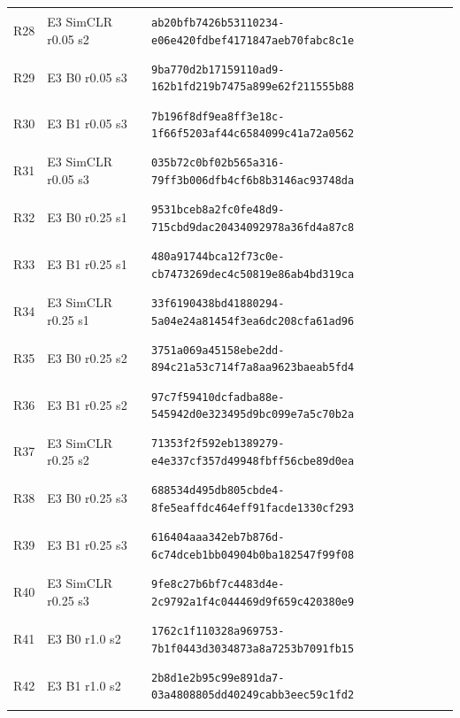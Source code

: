 \begin{longtable}{@{}l>{\raggedright\arraybackslash}p{3.5cm}p{10.8cm}@{}}
\hypertarget{R28}{R28} & E3 SimCLR r0.05 s2 & {\fontsize{8.8}{11}\selectfont\texttt{ab20bfb7426b53110234-e06e420fdbef4171847aeb70fabc8c1e}} \\
\hypertarget{R29}{R29} & E3 B0 r0.05 s3 & {\fontsize{8.8}{11}\selectfont\texttt{9ba770d2b17159110ad9-162b1fd219b7475a899e62f211555b88}} \\
\hypertarget{R30}{R30} & E3 B1 r0.05 s3 & {\fontsize{8.8}{11}\selectfont\texttt{7b196f8df9ea8ff3e18c-1f66f5203af44c6584099c41a72a0562}} \\
\hypertarget{R31}{R31} & E3 SimCLR r0.05 s3 & {\fontsize{8.8}{11}\selectfont\texttt{035b72c0bf02b565a316-79ff3b006dfb4cf6b8b3146ac93748da}} \\
\hypertarget{R32}{R32} & E3 B0 r0.25 s1 & {\fontsize{8.8}{11}\selectfont\texttt{9531bceb8a2fc0fe48d9-715cbd9dac20434092978a36fd4a87c8}} \\
\hypertarget{R33}{R33} & E3 B1 r0.25 s1 & {\fontsize{8.8}{11}\selectfont\texttt{480a91744bca12f73c0e-cb7473269dec4c50819e86ab4bd319ca}} \\
\hypertarget{R34}{R34} & E3 SimCLR r0.25 s1 & {\fontsize{8.8}{11}\selectfont\texttt{33f6190438bd41880294-5a04e24a81454f3ea6dc208cfa61ad96}} \\
\hypertarget{R35}{R35} & E3 B0 r0.25 s2 & {\fontsize{8.8}{11}\selectfont\texttt{3751a069a45158ebe2dd-894c21a53c714f7a8aa9623baeab5fd4}} \\
\hypertarget{R36}{R36} & E3 B1 r0.25 s2 & {\fontsize{8.8}{11}\selectfont\texttt{97c7f59410dcfadba88e-545942d0e323495d9bc099e7a5c70b2a}} \\
\hypertarget{R37}{R37} & E3 SimCLR r0.25 s2 & {\fontsize{8.8}{11}\selectfont\texttt{71353f2f592eb1389279-e4e337cf357d49948fbff56cbe89d0ea}} \\
\hypertarget{R38}{R38} & E3 B0 r0.25 s3 & {\fontsize{8.8}{11}\selectfont\texttt{688534d495db805cbde4-8fe5eaffdc464eff91facde1330cf293}} \\
\hypertarget{R39}{R39} & E3 B1 r0.25 s3 & {\fontsize{8.8}{11}\selectfont\texttt{616404aaa342eb7b876d-6c74dceb1bb04904b0ba182547f99f08}} \\
\hypertarget{R40}{R40} & E3 SimCLR r0.25 s3 & {\fontsize{8.8}{11}\selectfont\texttt{9fe8c27b6bf7c4483d4e-2c9792a1f4c044469d9f659c420380e9}} \\
\hypertarget{R41}{R41} & E3 B0 r1.0 s2 & {\fontsize{8.8}{11}\selectfont\texttt{1762c1f110328a969753-7b1f0443d3034873a8a7253b7091fb15}} \\
\hypertarget{R42}{R42} & E3 B1 r1.0 s2 & {\fontsize{8.8}{11}\selectfont\texttt{2b8d1e2b95c99e891da7-03a4808805dd40249cabb3eec59c1fd2}} \\

\end{longtable}
